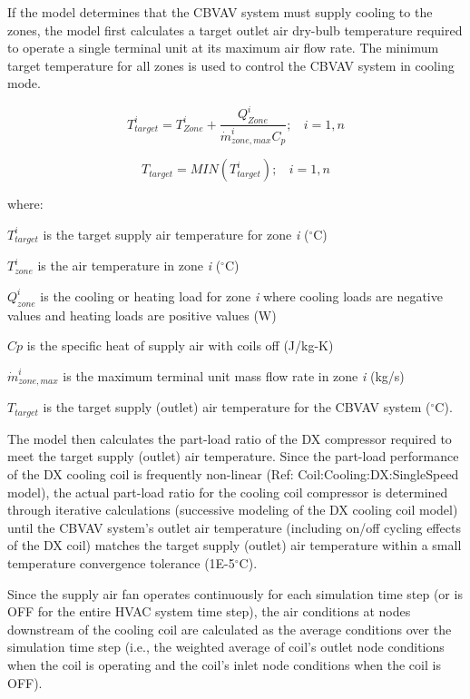 If the model determines that the CBVAV system must supply cooling to the zones, the model first calculates a target outlet air dry-bulb temperature required to operate a single terminal unit at its maximum air flow rate. The minimum target temperature for all zones is used to control the CBVAV system in cooling mode.

\begin{equation}
  T_{target}^i = T_{Zone}^i + \frac{Q_{Zone}^i}{\dot{m}_{zone,max}^i C_p};~~~~i = 1,n
\end{equation}

\begin{equation}
{T_{target}} = MIN\left( {T_{target}^i} \right);~~~~i = 1,n
\end{equation}

where:

\(T_{target}^i\) is the target supply air temperature for zone \emph{i} (\(^{\circ}\)C)

\(T_{zone}^i\) is the air temperature in zone \emph{i} (\(^{\circ}\)C)

\(Q_{zone}^i\) is the cooling or heating load for zone \emph{i} where cooling loads are negative values and heating loads are positive values (W)

\(Cp\) is the specific heat of supply air with coils off (J/kg-K)

\(\dot m_{zone,max}^i\) is the maximum terminal unit mass flow rate in zone \emph{i} (kg/s)

\(T_{target}^{}\) is the target supply (outlet) air temperature for the CBVAV system (\(^{\circ}\)C).

The model then calculates the part-load ratio of the DX compressor required to meet the target supply (outlet) air temperature. Since the part-load performance of the DX cooling coil is frequently non-linear (Ref: Coil:Cooling:DX:SingleSpeed model), the actual part-load ratio for the cooling coil compressor is determined through iterative calculations (successive modeling of the DX cooling coil model) until the CBVAV system's outlet air temperature (including on/off cycling effects of the DX coil) matches the target supply (outlet) air temperature within a small temperature convergence tolerance (1E-5\(^{\circ}\)C).

Since the supply air fan operates continuously for each simulation time step (or is OFF for the entire HVAC system time step), the air conditions at nodes downstream of the cooling coil are calculated as the average conditions over the simulation time step (i.e., the weighted average of coil's outlet node conditions when the coil is operating and the coil's inlet node conditions when the coil is OFF).


